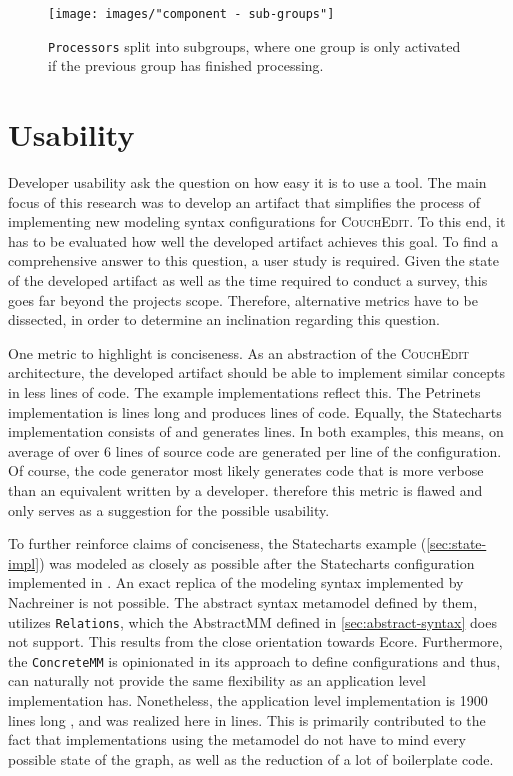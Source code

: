 \begin{figure}
\centering
\texttt{[image: images/"component - sub-groups"]}
\caption{\texttt{Processors} split into subgroups, where one group is only activated if the previous group has finished processing.}
\label{fig:sub-groups}
\end{figure}

\section{Usability}
Developer usability ask the question on how easy it is to use a tool. The main focus of this research was to develop an artifact that simplifies the process of implementing new modeling syntax configurations for \textsc{CouchEdit}. To this end, it has to be evaluated how well the developed artifact achieves this goal. To find a comprehensive answer to this question, a user study is required. Given the state of the developed artifact as well as the time required to conduct a survey, this goes far beyond the projects scope. Therefore, alternative metrics have to be dissected, in order to determine an inclination regarding this question. 

One metric to highlight is conciseness. As an abstraction of the \textsc{CouchEdit} architecture, the developed artifact should be able to implement similar concepts in less lines of code. The example implementations reflect this. The Petrinets implementation is \petriConfigLoC lines long and produces \petriGeneratedLoC lines of code. Equally, the Statecharts implementation consists of \stateConfigLoC and generates \stateGeneratedLoC lines. In both examples, this means, on average of over 6 lines of source code are generated per line of the configuration. Of course, the code generator most likely generates code that is more verbose than an equivalent written by a developer. therefore this metric is flawed and only serves as a suggestion for the possible usability. 

To further reinforce claims of conciseness, the Statecharts example (\ref{sec:state-impl}) was modeled as closely as possible after the Statecharts configuration implemented in \cite{nachreiner_couchedit_2020}. An exact replica of the modeling syntax implemented by Nachreiner is not possible. The abstract syntax metamodel defined by them, utilizes \texttt{Relations}, which the AbstractMM defined in \ref{sec:abstract-syntax} does not support. This results from the close orientation towards Ecore. Furthermore, the \texttt{ConcreteMM} is opinionated in its approach to define configurations and thus, can naturally not provide the same flexibility as an application level implementation has. Nonetheless, the application level implementation is 1900 lines long \cite{nachreiner_couchedit_2020}, and was realized here in \stateConfigLoC lines. This is primarily contributed to the fact that implementations using the metamodel do not have to mind every possible state of the graph, as well as the reduction of a lot of boilerplate code.

